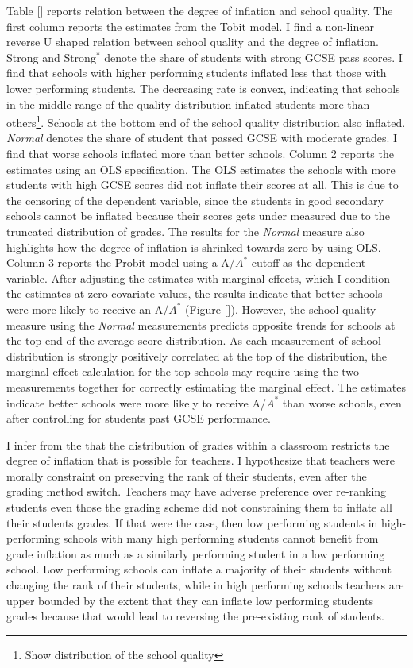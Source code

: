 Table [] reports relation between the degree of inflation and school quality. The first column reports the estimates from the Tobit model. I find a non-linear reverse U shaped relation between school quality and the degree of inflation. Strong and Strong$^*$ denote the share of students with strong GCSE pass scores. I find that schools with higher performing students inflated less that those with lower performing students. The decreasing rate is convex, indicating that schools in the middle range of the quality distribution inflated students more than others\footnote{Show distribution of the school quality}. Schools at the bottom end of the school quality distribution also inflated. \emph{Normal} denotes the share of student that passed GCSE with moderate grades. I find that worse schools inflated more than better schools. Column 2 reports the estimates using an OLS specification. The OLS estimates the schools with more students with high GCSE scores did not inflate their scores at all. This is due to the censoring of the dependent variable, since the students in good secondary schools cannot be inflated because their scores gets under measured due to the truncated distribution of grades. The results for the \emph{Normal} measure also highlights how the degree of inflation is shrinked towards zero by using OLS. Column 3 reports the Probit model using a A/$A^*$ cutoff as the dependent variable. After adjusting the estimates with marginal effects, which I condition the estimates at zero covariate values, the results indicate that better schools were more likely to receive an A/$A^*$ (Figure []). However, the school quality measure using the \emph{Normal} measurements predicts opposite trends for schools at the top end of the average score distribution. As each measurement of school distribution is strongly positively correlated at the top of the distribution, the marginal effect calculation for the top schools may require using the two measurements together for correctly estimating the marginal effect. The estimates indicate better schools were more likely to receive A/$A^*$ than worse schools, even after controlling for students past GCSE performance.

I infer from the  that the distribution of grades within a classroom restricts the degree of inflation that is possible for teachers. I hypothesize that teachers were morally constraint on preserving the rank of their students, even after the grading method switch. Teachers may have adverse preference over re-ranking students even those the grading scheme did not constraining them to inflate all their students grades. If that were the case, then low performing students in high-performing schools with many high performing students cannot benefit from grade inflation as much as a similarly performing student in a low performing school. Low performing schools can inflate a majority of their students without changing the rank of their students, while in high performing schools teachers are upper bounded by the extent that they can inflate low performing students grades because that would lead to reversing the pre-existing rank of students. 

